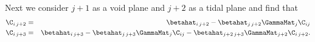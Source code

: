 Next we consider $j +1$ as a void plane and $j + 2$ as a tidal plane and find that
\begin{eqnarray}
\C_{i \, j+2} &=& \betahat_{i \, j+2} - \betahat_{j \, j + 2} \GammaMat_j \C_{i j}\\
\C_{i \, j+3} &=& \betahat_{i \, j+3} - \betahat_{j \, j + 3} \GammaMat_j \C_{i j} - \betahat_{j+2 \, j+3} \GammaMat_{j+2} \C_{i \, j+2}.
\end{eqnarray}
  
  